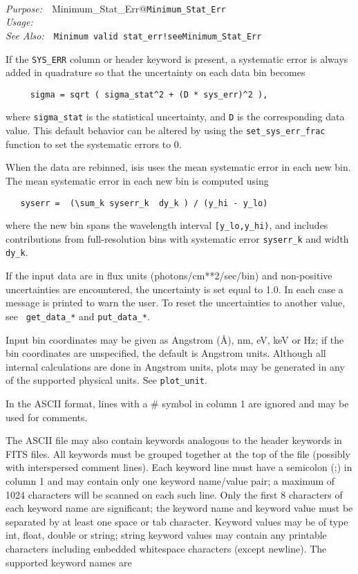 \documentclass{book}
\makeatletter
\newif\ifpdf
\newenvironment{isisfunction}[4]%
{\index{{#1}@{\tt #1}}%
  \ifpdf
  \else
     \addcontentsline{toc}{subsection}{{#1} -- {#2}}
  \fi
  \vbox{
          \vspace*{\baselineskip}
          {\LARGE\tt #1}\vspace*{\baselineskip}\\
          {{\it Purpose:}~~{#2}}\\
          {{\it Usage:}~~{\tt #3}}\\
          {{\it See Also:}~~{\tt #4}}
       }
}%
{ }
\makeatother
\begin{document}
{\begin{isisfunction}
\index{Minimum\_Stat\_Err@{\tt Minimum\_Stat\_Err}}
\index{Minimum valid stat\_err!see{{\tt Minimum\_Stat\_Err}}}

If the \verb|SYS_ERR| column or header keyword is present, a
systematic error is always added in quadrature so that the
uncertainty on each data bin becomes
\begin{verbatim}
     sigma = sqrt ( sigma_stat^2 + (D * sys_err)^2 ),
\end{verbatim}
where \verb|sigma_stat| is the statistical uncertainty, and
\verb|D| is the corresponding data value.  This default
behavior can be altered by using the \verb|set_sys_err_frac|
function to set the systematic errors to 0.

When the data are rebinned, isis uses the mean systematic error
in each new bin.  The mean systematic error in each new bin is
computed using
\begin{verbatim}
   syserr =  (\sum_k syserr_k  dy_k ) / (y_hi - y_lo)
\end{verbatim}
where the new bin spans the wavelength interval
\verb|[y_lo,y_hi)|, and includes contributions from
full-resolution bins with systematic error \verb|syserr_k| and
width \verb|dy_k|.

If the input data are in flux units (photons/cm**2/sec/bin) and
non-positive uncertainties are encountered, the uncertainty is
set equal to 1.0. In each case a message is printed to warn the
user.  To reset the uncertainties to another value, see {\tt
get\_data\_*} and {\tt put\_data\_*}.

Input bin coordinates may be given as Angstrom (\AA), nm, eV, keV or
Hz; if the bin coordinates are unspecified, the default is Angstrom
units. Although all internal calculations are done in Angstrom units,
plots may be generated in any of the supported physical units. See
{\tt plot\_unit}.

In the ASCII format, lines with a \# symbol in column 1 are ignored
and may be used for comments.

The ASCII file may also contain keywords analogous to the header
keywords in FITS files.  All keywords must be grouped together at the
top of the file (possibly with interspersed comment lines).  Each
keyword line must have a semicolon (;) in column 1 and may contain
only one keyword name/value pair; a maximum of 1024 characters will be
scanned on each such line. Only the first 8 characters of each keyword
name are significant; the keyword name and keyword value must be
separated by at least one space or tab character. Keyword values may
be of type int, float, double or string; string keyword values may
contain any printable characters including embedded whitespace
characters (except newline). The supported keyword names are


\end{isisfunction}}
\end{document}
